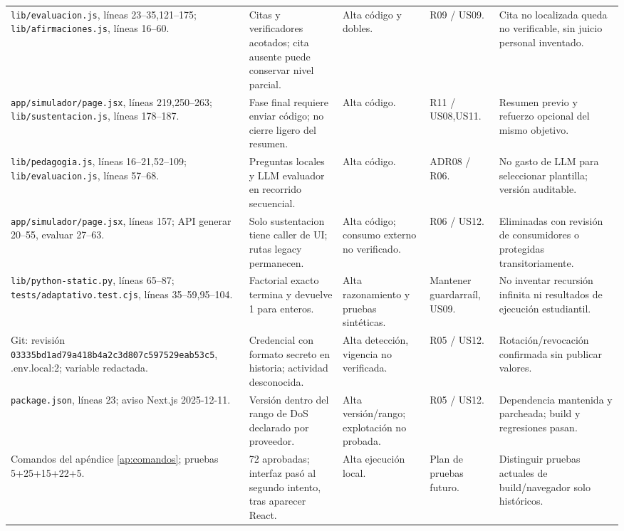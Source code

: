 \documentclass[11pt,a4paper]{report}
\newcommand{\src}[2]{\nolinkurl{#1}, líneas #2}
\begin{document}
\begin{landscape}
\begin{longtable}{P{6cm}P{6cm}P{3cm}P{4cm}P{4.4cm}}
\src{lib/evaluacion.js}{23--35,121--175}; \src{lib/afirmaciones.js}{16--60}. & Citas y verificadores acotados; cita ausente puede conservar nivel parcial. & Alta código y dobles. & R09 / US09. & Cita no localizada queda no verificable, sin juicio personal inventado.\\
\src{app/simulador/page.jsx}{219,250--263}; \src{lib/sustentacion.js}{178--187}. & Fase final requiere enviar código; no cierre ligero del resumen. & Alta código. & R11 / US08,US11. & Resumen previo y refuerzo opcional del mismo objetivo.\\
\src{lib/pedagogia.js}{16--21,52--109}; \src{lib/evaluacion.js}{57--68}. & Preguntas locales y LLM evaluador en recorrido secuencial. & Alta código. & ADR08 / R06. & No gasto de LLM para seleccionar plantilla; versión auditable.\\
\src{app/simulador/page.jsx}{157}; API generar 20--55, evaluar 27--63. & Solo sustentacion tiene caller de UI; rutas legacy permanecen. & Alta código; consumo externo no verificado. & R06 / US12. & Eliminadas con revisión de consumidores o protegidas transitoriamente.\\
\src{lib/python-static.py}{65--87}; \src{tests/adaptativo.test.cjs}{35--59,95--104}. & Factorial exacto termina y devuelve 1 para enteros. & Alta razonamiento y pruebas sintéticas. & Mantener guardarraíl, US09. & No inventar recursión infinita ni resultados de ejecución estudiantil.\\
Git: revisión \nolinkurl{03335bd1ad79a418b4a2c3d807c597529eab53c5}, .env.local:2; variable redactada. & Credencial con formato secreto en historia; actividad desconocida. & Alta detección, vigencia no verificada. & R05 / US12. & Rotación/revocación confirmada sin publicar valores.\\
\src{package.json}{23}; aviso Next.js 2025-12-11. & Versión dentro del rango de DoS declarado por proveedor. & Alta versión/rango; explotación no probada. & R05 / US12. & Dependencia mantenida y parcheada; build y regresiones pasan.\\
Comandos del apéndice \ref{ap:comandos}; pruebas 5+25+15+22+5. & 72 aprobadas; interfaz pasó al segundo intento, tras aparecer React. & Alta ejecución local. & Plan de pruebas futuro. & Distinguir pruebas actuales de build/navegador solo históricos.\\\bottomrule
\end{longtable}
\end{landscape}
\end{document}

